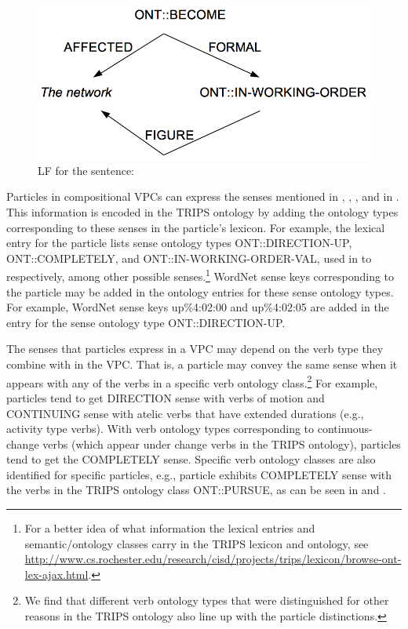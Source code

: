 \documentclass[output=paper,modfonts,nonflat]{langsci/langscibook}
\begin{document}
\begin{figure}[!t]
\includegraphics[scale=0.6]{figures/LF3_uppercase}
\caption{LF for the sentence: }\label{fig:lf3}
\end{figure}


Particles in compositional VPCs can express the senses mentioned in , , , and in . This information is encoded in the TRIPS ontology by adding the ontology types corresponding to these senses in the particle's lexicon. For example, the lexical entry for the particle  lists sense ontology types ONT::DIRECTION-UP, ONT::COMPLETELY, and ONT::IN-WORKING-ORDER-VAL, used in  to  respectively, among other possible senses.\footnote{For a better idea of what information the lexical entries and semantic/ontology classes carry in the TRIPS lexicon and ontology, see  \url{http://www.cs.rochester.edu/research/cisd/projects/trips/lexicon/browse-ont-lex-ajax.html}.} WordNet sense keys corresponding to the particle may be added in the ontology entries for these sense ontology types. For example, WordNet sense keys up\%4:02:00 and up\%4:02:05 are added in the entry for the sense ontology type ONT::DIRECTION-UP.

The senses that particles express in a VPC may depend on the verb type they combine with in the VPC. That is, a particle may convey the same sense when it appears with any of the verbs in a specific verb ontology class.\footnote{We find that different verb ontology types that were distinguished for other reasons in the TRIPS  ontology \citep{All07} also line up with the particle distinctions.} For example, particles tend to get DIRECTION sense with verbs of motion and CONTINUING sense with atelic verbs that have extended durations (e.g., activity type verbs). With verb ontology types corresponding to continuous-change verbs (which appear under change verbs in the TRIPS ontology), particles tend to get the COMPLETELY sense. Specific verb ontology classes are also identified for specific particles, e.g., particle  exhibits COMPLETELY sense with the verbs in the TRIPS ontology class ONT::PURSUE, as can be seen in 
and .
\end{document}
